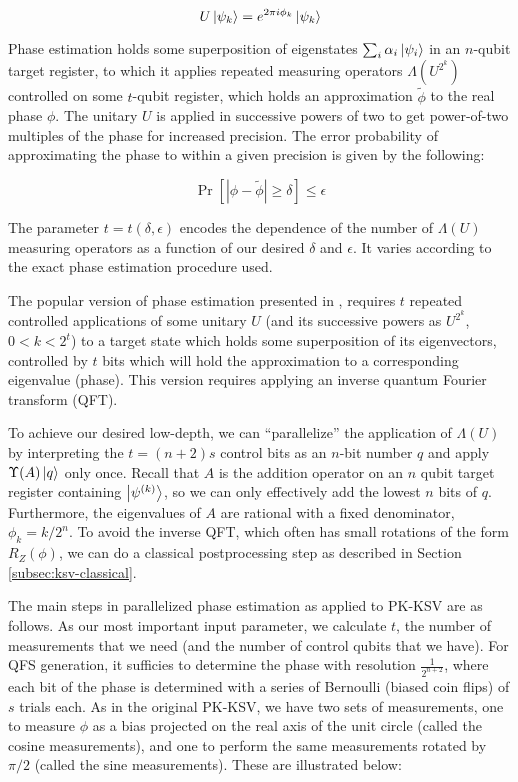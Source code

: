 \begin{displaymath}
U\left\vert{\psi_k}\right\rangle = e^{2\pi i \phi_k} \left\vert{\psi_k}\right\rangle
\end{displaymath}

Phase estimation holds some superposition of eigenstates
$\sum_{i} \alpha_i \left\vert{\psi_i}\right\rangle$
in an $n$-qubit target register, to which it applies repeated measuring
operators $\Lambda(U^{2^k})$
controlled on some $t$-qubit register, which holds an
approximation $\tilde{\phi}$ to the real phase $\phi$.
The unitary $U$ is applied in successive powers of two to get
power-of-two multiples of the phase for increased precision.
The error probability of approximating the phase to within a given
precision is given by the following:

\begin{displaymath}
\Pr\left[ | \phi - \tilde{\phi} | \ge \delta \right] \le \epsilon
\end{displaymath}

The parameter $t = t(\delta, \epsilon)$ encodes the dependence of the number
of $\Lambda(U)$ measuring operators as a function of our desired
$\delta$ and $\epsilon$.
It varies according to the exact phase estimation procedure
used.

The popular version of phase estimation presented in \cite{Nielsen2000},
requires $t$ repeated controlled applications of some unitary
$U$ (and its successive powers as $U^{2^k}$, $0<k<2^t$)
to a target state which holds some superposition of its eigenvectors,
controlled by $t$ bits which will hold the approximation to a corresponding
eigenvalue (phase).
This version requires applying an inverse quantum Fourier
transform (QFT).

To achieve our desired low-depth, we can ``parallelize'' the application of
$\Lambda(U)$ by interpreting the
$t = (n+2)s$ control bits as an $n$-bit number $q$ and
apply $\Upsilon(A)\left\vert{q}\right\rangle$ only once.
Recall that $A$ is the addition operator on an $n$ qubit
target register containing $\left\vert{\psi^{(k)}}\right\rangle$, so we can
only effectively add the lowest $n$ bits of $q$.
Furthermore, the eigenvalues of $A$ are rational with a fixed
denominator, $\phi_k = k / 2^n$.
To avoid the inverse QFT, which often has small rotations of the form 
$R_Z(\phi)$, 
we can do a classical postprocessing step as described in Section \ref{subsec:ksv-classical}.

The main steps in parallelized phase estimation as applied to PK-KSV
are as follows. As our most important input parameter, we calculate $t$, the number
of measurements that we need (and the number of control qubits that we have).
For QFS generation, it sufficies to determine the phase with resolution $\frac{1}{2^{n+2}}$,
where each bit of the phase is determined with a series of Bernoulli (biased coin flips)
of $s$ trials each. As in the original PK-KSV, we have two sets of measurements,
one to measure $\phi$ as a bias projected on the real axis of the unit circle (called
the cosine measurements), and one to perform the same measurements rotated by $\pi/2$
(called the sine measurements). These are illustrated below:

